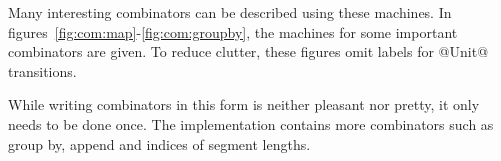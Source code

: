 Many interesting combinators can be described using these machines.
In figures~\ref{fig:com:map}-\ref{fig:com:groupby}, the machines for some important combinators are given.
To reduce clutter, these figures omit labels for @Unit@ transitions.

While writing combinators in this form is neither pleasant nor pretty, it only needs to be done once.
The implementation contains more combinators such as group by, append and indices of segment lengths.





